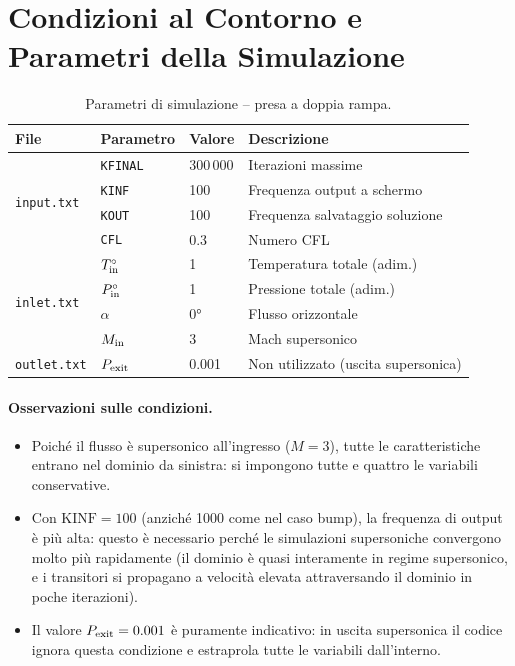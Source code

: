 \section{Condizioni al Contorno e Parametri della Simulazione}
\label{sec:presa_bc}

\begin{table}[H]
  \centering
  \caption{Parametri di simulazione -- presa a doppia rampa.}
  \label{tab:presa_param}
  \begin{tabular}{llll}
    \toprule
    File & Parametro & Valore & Descrizione \\
    \midrule
    \multirow{4}{*}{\texttt{input.txt}}
      & \texttt{KFINAL} & 300\,000 & Iterazioni massime \\
      & \texttt{KINF}   & 100      & Frequenza output a schermo \\
      & \texttt{KOUT}   & 100      & Frequenza salvataggio soluzione \\
      & \texttt{CFL}    & 0.3      & Numero CFL \\
    \midrule
    \multirow{4}{*}{\texttt{inlet.txt}}
      & $T^\circ_{\rm in}$ & 1  & Temperatura totale (adim.) \\
      & $P^\circ_{\rm in}$ & 1  & Pressione totale (adim.) \\
      & $\alpha$           & 0° & Flusso orizzontale \\
      & $M_{\rm in}$       & 3  & Mach supersonico \\
    \midrule
    \texttt{outlet.txt}
      & $P_{\rm exit}$ & 0.001 & Non utilizzato (uscita supersonica) \\
    \bottomrule
  \end{tabular}
\end{table}

\paragraph{Osservazioni sulle condizioni.}
\begin{itemize}
  \item Poiché il flusso è supersonico all'ingresso ($M = 3$), tutte le caratteristiche
    entrano nel dominio da sinistra: si impongono tutte e quattro le variabili conservative.
  \item Con $\text{KINF} = 100$ (anziché 1000 come nel caso bump), la frequenza di output
    è più alta: questo è necessario perché le simulazioni supersoniche convergono molto più
    rapidamente (il dominio è quasi interamente in regime supersonico, e i transitori si
    propagano a velocità elevata attraversando il dominio in poche iterazioni).
  \item Il valore $P_{\rm exit} = 0.001$ è puramente indicativo: in uscita supersonica
    il codice ignora questa condizione e estraprola tutte le variabili dall'interno.
\end{itemize}

